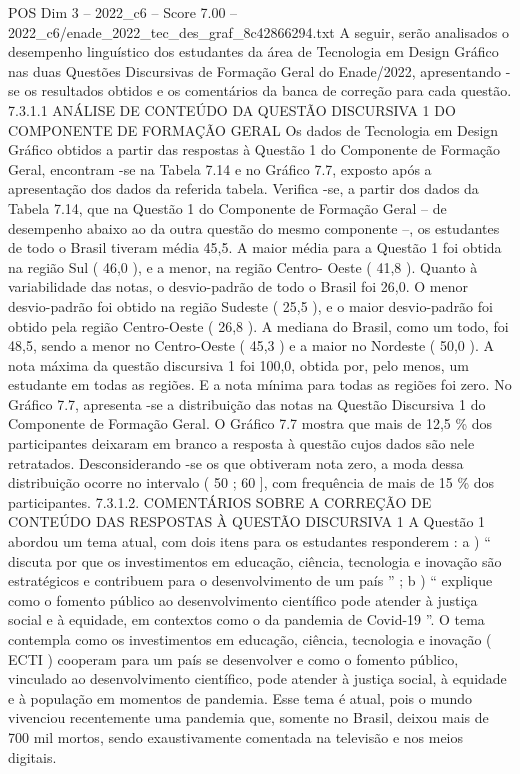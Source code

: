 \begin{textsample}{POS Dim 3 – 2022\_c6 – Score 7.00 – 2022\_c6/enade\_2022\_tec\_des\_graf\_8c42866294.txt}
A seguir, serão analisados o desempenho linguístico dos estudantes da área de Tecnologia em Design Gráfico nas duas Questões Discursivas de Formação Geral do Enade/2022, apresentando -se os resultados obtidos e os comentários da banca de correção para cada questão. 7.3.1.1 ANÁLISE DE CONTEÚDO DA QUESTÃO DISCURSIVA 1 DO COMPONENTE DE FORMAÇÃO GERAL Os dados de Tecnologia em Design Gráfico obtidos a partir das respostas à Questão 1 do Componente de Formação Geral, encontram -se na Tabela 7.14 e no Gráfico 7.7, exposto após a apresentação dos dados da referida tabela.
Verifica -se, a partir dos dados da Tabela 7.14, que na Questão 1 do Componente de Formação Geral – de desempenho abaixo ao da outra questão do mesmo componente –, os estudantes de todo o Brasil tiveram média 45,5.
A maior média para a Questão 1 foi obtida na região Sul ( 46,0 ), e a menor, na região Centro- Oeste ( 41,8 ).
Quanto à variabilidade das notas, o desvio-padrão de todo o Brasil foi 26,0.
O menor desvio-padrão foi obtido na região Sudeste ( 25,5 ), e o maior desvio-padrão foi obtido pela região Centro-Oeste ( 26,8 ).
A mediana do Brasil, como um todo, foi 48,5, sendo a menor no Centro-Oeste ( 45,3 ) e a maior no Nordeste ( 50,0 ).
A nota máxima da questão discursiva 1 foi 100,0, obtida por, pelo menos, um estudante em todas as regiões.
E a nota mínima para todas as regiões foi zero.
No Gráfico 7.7, apresenta -se a distribuição das notas na Questão Discursiva 1 do Componente de Formação Geral.
O Gráfico 7.7 mostra que mais de 12,5 \% dos participantes deixaram em branco a resposta à questão cujos dados são nele retratados.
Desconsiderando -se os que obtiveram nota zero, a moda dessa distribuição ocorre no intervalo ( 50 ; 60 ], com frequência de mais de 15 \% dos participantes. 7.3.1.2.
COMENTÁRIOS SOBRE A CORREÇÃO DE CONTEÚDO DAS RESPOSTAS À QUESTÃO DISCURSIVA 1 A Questão 1 abordou um tema atual, com dois itens para os estudantes responderem : a ) “ discuta por que os investimentos em educação, ciência, tecnologia e inovação são estratégicos e contribuem para o desenvolvimento de um país ” ; b ) “ explique como o fomento público ao desenvolvimento científico pode atender à justiça social e à equidade, em contextos como o da pandemia de Covid-19 ”.
O tema contempla como os investimentos em educação, ciência, tecnologia e inovação ( ECTI ) cooperam para um país se desenvolver e como o fomento público, vinculado ao desenvolvimento científico, pode atender à justiça social, à equidade e à população em momentos de pandemia.
Esse tema é atual, pois o mundo vivenciou recentemente uma pandemia que, somente no Brasil, deixou mais de 700 mil mortos, sendo exaustivamente comentada na televisão e nos meios digitais.

\end{textsample}
